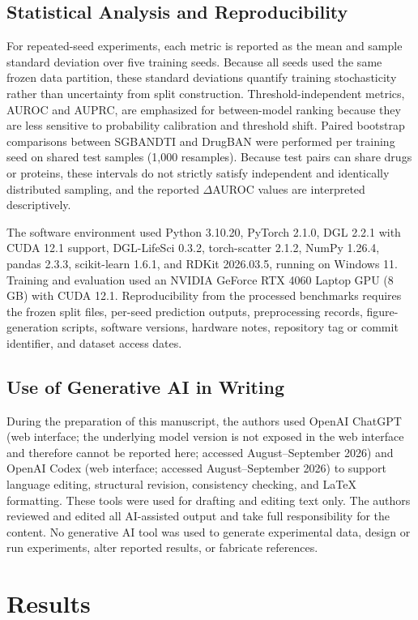 \documentclass[computers,article,submit,moreauthors]{Definitions/mdpi}
\begin{document}
\subsection{Statistical Analysis and Reproducibility}
For repeated-seed experiments, each metric is reported as the mean and sample standard deviation over five training seeds. Because all seeds used the same frozen data partition, these standard deviations quantify training stochasticity rather than uncertainty from split construction. Threshold-independent metrics, AUROC and AUPRC, are emphasized for between-model ranking because they are less sensitive to probability calibration and threshold shift. Paired bootstrap comparisons between SGBANDTI and DrugBAN were performed per training seed on shared test samples (1,000 resamples). Because test pairs can share drugs or proteins, these intervals do not strictly satisfy independent and identically distributed sampling, and the reported $\Delta$AUROC values are interpreted descriptively.

The software environment used Python 3.10.20, PyTorch 2.1.0, DGL 2.2.1 with CUDA 12.1 support, DGL-LifeSci 0.3.2, torch-scatter 2.1.2, NumPy 1.26.4, pandas 2.3.3, scikit-learn 1.6.1, and RDKit 2026.03.5, running on Windows 11. Training and evaluation used an NVIDIA GeForce RTX 4060 Laptop GPU (8 GB) with CUDA 12.1. Reproducibility from the processed benchmarks requires the frozen split files, per-seed prediction outputs, preprocessing records, figure-generation scripts, software versions, hardware notes, repository tag or commit identifier, and dataset access dates.

\subsection{Use of Generative AI in Writing}
During the preparation of this manuscript, the authors used OpenAI ChatGPT (web interface; the underlying model version is not exposed in the web interface and therefore cannot be reported here; accessed August--September 2026) and OpenAI Codex (web interface; accessed August--September 2026) to support language editing, structural revision, consistency checking, and LaTeX formatting. These tools were used for drafting and editing text only. The authors reviewed and edited all AI-assisted output and take full responsibility for the content. No generative AI tool was used to generate experimental data, design or run experiments, alter reported results, or fabricate references.

\section{Results}
\end{document}
